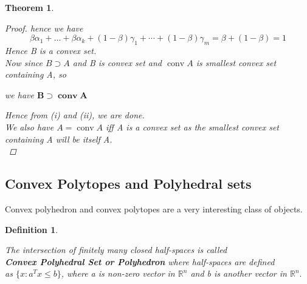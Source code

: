 \documentclass[oneside]{book}
\newtheorem{theorem}{Theorem}[section]
\newtheorem{mydef}{Definition}[section]
\begin{document}
\begin{theorem}
\begin{proof}
			hence we have \\
			$$
			\beta \alpha_{1}+\ldots+\beta \alpha_{k}+(1-\beta) \gamma_{1}+\cdots+(1-\beta) \gamma_{m}=\beta+(1-\beta)=1
			$$
			Hence B is a convex set.\\
			
			Now since $ B \supset A $ and B is convex set and $\operatorname{conv} A $ is smallest convex set containing A, so
			
			we have  $ \mathbf{B} \supset \mathbf{\operatorname{conv} A}  $ \par
			Hence from (i) and (ii), we are done. \\
			We also have $A = \operatorname{conv} A$ iff A is a convex set as the smallest convex set containing A will be itself A. \\
			
		\end{proof}
		
	\end{theorem}
	
	
	
	
	
	
	
	
	
	
	
	
	
	
	
	
	
	
	
	
	
	
	
	
	
	
	
	
	
	
	
	
	
	
	\subsection{ Convex Polytopes and Polyhedral sets } \label{ss:16}
	Convex polyhedron and convex polytopes are a very interesting class of objects. 
	\begin{mydef} \label{d:5}
		
		The intersection of finitely many closed half-spaces is called \\
		\textbf{ Convex Polyhedral Set  or Polyhedron}
		where half-spaces are defined \\
		as $\{ x : a^{T}x \leq b\} $,  where a is non-zero vector in $\mathbb{R}^n$ and b is another vector in  $\mathbb{R}^n.$  
		
		
	\end{mydef}
	
\end{document}
